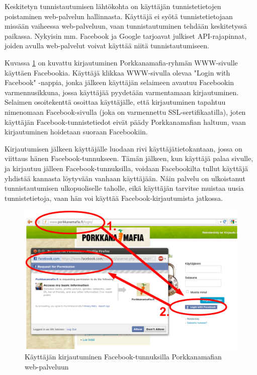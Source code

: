 Keskitetyn tunnistautumisen lähtökohta on käyttäjän tunnistetietojen poistaminen web-palvelun hallinnasta. Käyttäjä ei syötä tunnistetietojaan missään vaiheessa web-palveluun, vaan tunnistautuminen tehdään keskitetyssä paikassa. Nykyisin mm. Facebook ja Google tarjoavat julkiset API-rajapinnat, joiden avulla web-palvelut voivat käyttää niitä tunnistautumiseen.

Kuvassa \ref{facebook_login} on kuvattu kirjautuminen Porkkanamafia-ryhmän WWW-sivulle käyttäen Facebookia. Käyttäjä klikkaa WWW-sivulla olevaa "Login with Facebook" -nappia, jonka jälkeen käyttäjän selaimeen avautuu Facebookin varmennusikkuna, jossa käyttäjää pyydetään varmentamaan kirjautuminen. Selaimen osoitekenttä osoittaa käyttäjälle, että kirjautuminen tapahtuu nimenomaan Facebook-sivulla (joka on varmennettu SSL-sertifikaatilla), joten käyttäjän Facebook-tunnistetiedot eivät päädy Porkkanamafian haltuun, vaan kirjautuminen hoidetaan suoraan Facebookiin.

Kirjautumisen jälkeen käyttäjälle luodaan rivi käyttäjätietokantaan, jossa on viittaus hänen Facebook-tunnukseen. Tämän jälkeen, kun käyttäjä palaa sivulle, ja kirjautuu jälleen Facebook-tunnuksilla, voidaan Facebookilta tullut käyttäjä yhdistää kannasta löytyvään vanhaan käyttäjään. Näin palvelu on ulkoistanut tunnistautumisen ulkopuoliselle taholle, eikä käyttäjän tarvitse muistaa uusia tunnistetietoja, vaan hän voi käyttää Facebook-kirjautumista jatkossa.

\begin{figure}[ht]
\centering
\includegraphics[width=\textwidth]{teknologiat/facebook.eps}
\caption{Käyttäjän kirjautuminen Facebook-tunnuksilla Porkkanamafian web-palveluun}%
\label{facebook_login}
\end{figure}

